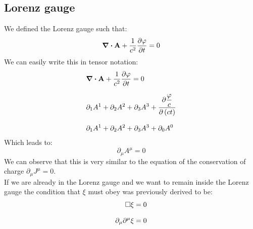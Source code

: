 \subsection{Lorenz gauge}
We defined the Lorenz gauge such that:
\begin{equation}
  \div{\vec{A}} +\dfrac{1}{c^2}\pdv{\potE}{t} = 0
\end{equation}
We can easily write this in tensor notation:
\begin{equation}
  \begin{split}
    &\div{\vec{A}} +\dfrac{1}{c^2}\pdv{\potE}{t} = 0 \\[8pt]
    &\partial_1A^1 + \partial_2A^2 + \partial_3A^3 +\pdv{\dfrac{\potE}{c}}{\brackets{ct}} \\[8pt]
    &\partial_1A^1 + \partial_2A^2 + \partial_3A^3 + \partial_0A^0
  \end{split}
\end{equation}
Which leads to:
\begin{equation}
  \boxed{\partial_{\mu}A^{\mu} = 0}
\end{equation}
We can observe that this is very similar to the equation of the conservation of charge $\partial_{\mu}J^{\mu} = 0$.\\
If we are already in the Lorenz gauge and we want to remain inside the Lorenz gauge the condition that $\xi$ must obey was previously derived to be:
\begin{equation}
  \begin{split}
    \square \xi = 0 \\[8pt]
    \partial_{\mu}\partial^{\mu}\xi = 0
  \end{split}
\end{equation}
